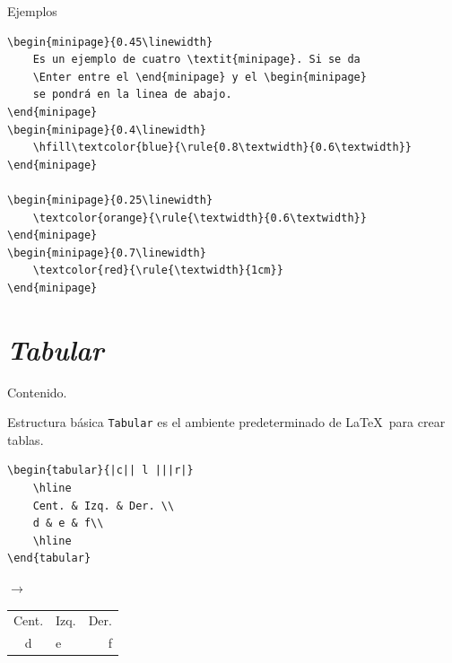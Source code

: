 \documentclass[dvipsnames,xcolor, handout]{beamer}
\theoremstyle{plain}
\theoremstyle{definition}
\begin{document}
\begin{frame}[fragile]{Ejemplos}
\begin{small}
\begin{verbatim}
\begin{minipage}{0.45\linewidth}
    Es un ejemplo de cuatro \textit{minipage}. Si se da
    \Enter entre el \end{minipage} y el \begin{minipage}
    se pondrá en la linea de abajo.
\end{minipage}
\begin{minipage}{0.4\linewidth}
    \hfill\textcolor{blue}{\rule{0.8\textwidth}{0.6\textwidth}}
\end{minipage}

\begin{minipage}{0.25\linewidth}
    \textcolor{orange}{\rule{\textwidth}{0.6\textwidth}}
\end{minipage}
\begin{minipage}{0.7\linewidth}
    \textcolor{red}{\rule{\textwidth}{1cm}}
\end{minipage}
\end{verbatim}
\end{small}
\end{frame}

\section{\itshape Tabular}
\begin{frame}{Contenido.}
\begin{multicols}{2}
  \tableofcontents[currentsection]
\end{multicols}
\end{frame}

\begin{frame}[fragile]{Estructura básica}
\verb!Tabular! es el ambiente predeterminado de \LaTeX\ para crear tablas. 

\begin{minipage}{0.57\linewidth}
\begin{verbatim}
\begin{tabular}{|c|| l |||r|}
    \hline
    Cent. & Izq. & Der. \\
    d & e & f\\
    \hline
\end{tabular}
\end{verbatim}
\end{minipage}
\begin{minipage}{0.1\linewidth}
    $\rightarrow$
\end{minipage}
\begin{minipage}{0.3\linewidth}
    \begin{tabular}[b]{|c|| l |||r|}
    \hline
    Cent. & Izq. & Der. \\
    d & e & f\\
    \hline
\end{tabular}
\end{minipage}
    
\end{frame}
\end{document}
